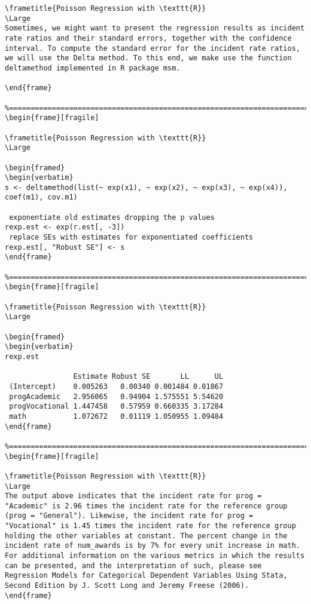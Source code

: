 \begin{frame}[fragile]
\begin{framed}
\begin{verbatim}
\frametitle{Poisson Regression with \texttt{R}}
\Large 
Sometimes, we might want to present the regression results as incident rate ratios and their standard errors, together with the confidence interval. To compute the standard error for the incident rate ratios, we will use the Delta method. To this end, we make use the function deltamethod implemented in R package msm.

\end{frame}

%================================================================================================%
\begin{frame}[fragile]

\frametitle{Poisson Regression with \texttt{R}}
\Large

\begin{framed}
\begin{verbatim}
s <- deltamethod(list(~ exp(x1), ~ exp(x2), ~ exp(x3), ~ exp(x4)), coef(m1), cov.m1)

 exponentiate old estimates dropping the p values
rexp.est <- exp(r.est[, -3])
 replace SEs with estimates for exponentiated coefficients
rexp.est[, "Robust SE"] <- s
\end{frame}

%================================================================================================%
\begin{frame}[fragile]

\frametitle{Poisson Regression with \texttt{R}}
\Large

\begin{framed}
\begin{verbatim}
rexp.est
 
                Estimate Robust SE       LL      UL
 (Intercept)    0.005263   0.00340 0.001484 0.01867
 progAcademic   2.956065   0.94904 1.575551 5.54620
 progVocational 1.447458   0.57959 0.660335 3.17284
 math           1.072672   0.01119 1.050955 1.09484
\end{frame}

%================================================================================================%
\begin{frame}[fragile]

\frametitle{Poisson Regression with \texttt{R}}
\Large 
The output above indicates that the incident rate for prog = "Academic" is 2.96 times the incident rate for the reference group (prog = "General"). Likewise, the incident rate for prog = "Vocational" is 1.45 times the incident rate for the reference group holding the other variables at constant. The percent change in the incident rate of num_awards is by 7% for every unit increase in math. For additional information on the various metrics in which the results can be presented, and the interpretation of such, please see Regression Models for Categorical Dependent Variables Using Stata, Second Edition by J. Scott Long and Jeremy Freese (2006).
\end{frame}


\end{verbatim}
\end{framed}
\end{frame}
